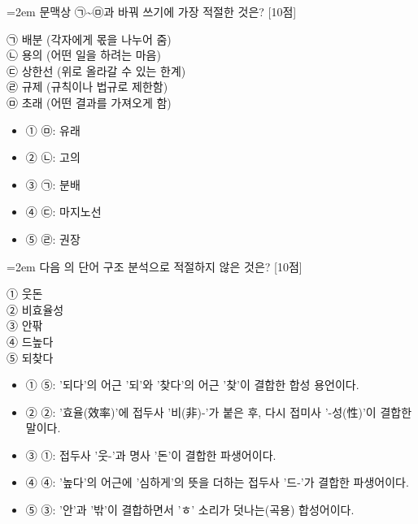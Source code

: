 \documentclass[10pt,a4paper]{article}
\newcommand{\qnum}[1]{%
  \tikz[baseline=(num.base)]{%
    \node[circle, fill=numCircle, text=white, inner sep=0pt,
          minimum size=18pt, font=\small\bfseries] (num) {#1};%
  }%
}
\newcommand{\pts}[1]{%
  \hfill\textcolor{ptsBadge}{[#1점]}%
}
\begin{document}
\vspace{4mm}
\begin{minipage}{\columnwidth}
{\hangindent=2em
\qnum{11}\enspace 문맥상 ㉠\textasciitilde{}㉤과 바꿔 쓰기에 가장 적절한 것은? \pts{10}
\par}

\vspace{3mm}
\begin{tcolorbox}[bogi]
㉠ 배분 (각자에게 몫을 나누어 줌) \\{}
㉡ 용의 (어떤 일을 하려는 마음) \\{}
㉢ 상한선 (위로 올라갈 수 있는 한계) \\{}
㉣ 규제 (규칙이나 법규로 제한함) \\{}
㉤ 초래 (어떤 결과를 가져오게 함)
\end{tcolorbox}
\vspace{3mm}
\begin{itemize}[leftmargin=2.5em, labelsep=0.3em, label={}, itemsep=4pt, parsep=1pt, topsep=0pt]
  \item ① ㉤: 유래
  \item ② ㉡: 고의
  \item ③ ㉠: 분배
  \item ④ ㉢: 마지노선
  \item ⑤ ㉣: 권장
\end{itemize}
\end{minipage}
\vspace{4mm}

\vspace{4mm}
\begin{minipage}{\columnwidth}
{\hangindent=2em
\qnum{12}\enspace 다음 의 단어 구조 분석으로 적절하지 않은 것은? \pts{10}
\par}

\vspace{3mm}
\begin{tcolorbox}[bogi]
① 웃돈 \\{}
② 비효율성 \\{}
③ 안팎 \\{}
④ 드높다 \\{}
⑤ 되찾다
\end{tcolorbox}
\vspace{3mm}
\begin{itemize}[leftmargin=2.5em, labelsep=0.3em, label={}, itemsep=4pt, parsep=1pt, topsep=0pt]
  \item ① ⑤: '되다'의 어근 '되'와 '찾다'의 어근 '찾'이 결합한 합성 용언이다.
  \item ② ②: '효율(效率)'에 접두사 '비(非)-'가 붙은 후, 다시 접미사 '-성(性)'이 결합한 말이다.
  \item ③ ①: 접두사 '웃-'과 명사 '돈'이 결합한 파생어이다.
  \item ④ ④: '높다'의 어근에 '심하게'의 뜻을 더하는 접두사 '드-'가 결합한 파생어이다.
  \item ⑤ ③: '안'과 '밖'이 결합하면서 'ㅎ' 소리가 덧나는(곡용) 합성어이다.
\end{itemize}
\end{minipage}
\vspace{4mm}
\end{document}
